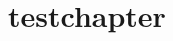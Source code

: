 \documentclass[titlepage, a4paper, LV, SHORT]{report}
\begin{document}
\chapter{testchapter}
\end{document}
